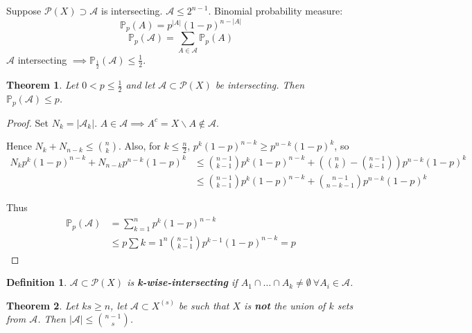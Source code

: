 \documentclass[a4paper]{article}
\newtheorem*{definition}{Definition}
\newtheorem{theorem}{Theorem}
\newcommand*\abs[1]{\left|#1\right|}
\begin{document}
Suppose $\mathcal{P}(X) \supset \mathcal{A}$ is intersecting.
$\mathcal{A} \leq 2^{n-1}$.
Binomial probability measure:
$$\mathbb{P}_p(A) = p^{\abs{A}}(1-p)^{n-\abs{A}}$$
$$\mathbb{P}_p(\mathcal{A}) = \sum_{A \in \mathcal{A}}\mathbb{P}_p(A)$$
$\mathcal{A}$ intersecting $\implies \mathbb{P}_{\frac{1}{2}}(\mathcal{A}) \leq \frac{1}{2}$.

\begin{theorem}
	Let $0<p\leq \frac{1}{2}$ and let $\mathcal{A} \subset \mathcal{P}(X)$ be intersecting.
	Then $\mathbb{P}_p(\mathcal{A}) \leq p$.
\end{theorem}
\begin{proof}
	Set $N_k = \abs{\mathcal{A}_k}$.
	$A \in \mathcal{A} \implies A^c = X\backslash A \not\in \mathcal{A}$.
	
	Hence $N_k + N_{n-k} \leq {n \choose k}$.
	Also, for $k \leq \frac{n}{2}$, $p^k(1-p)^{n-k} \geq p^{n-k}(1-p)^k$, so
	\begin{align*}
		N_kp^k(1-p)^{n-k} + N_{n-k}p^{n-k}(1-p)^k & \leq {n-1 \choose k-1}p^k(1-p)^{n-k} + \left({n \choose k} - {n-1 \choose k-1}\right)p^{n-k}(1-p)^k \\
		& \leq {n-1 \choose k-1}p^k(1-p)^{n-k} + {n-1 \choose n-k-1}p^{n-k}(1-p)^k
	\end{align*}
	
	Thus
	\begin{align*}
		\mathbb{P}_p(\mathcal{A}) &= \sum_{k=1}^n p^k(1-p)^{n-k} \\
		&\leq p \sum{k=1}^n {n-1 \choose k-1}p^{k-1}(1-p)^{n-k} = p
	\end{align*}
\end{proof}

\begin{definition}
	$\mathcal{A} \subset \mathcal{P}(X)$ is \textbf{k-wise-intersecting} if $A_1 \cap \dots \cap A_k \neq \emptyset\ \forall A_i \in \mathcal{A}$.
\end{definition}

\begin{theorem}
	Let $ks \geq n$,
	let $\mathcal{A} \subset X^{(s)}$ be such that $X$ is \textbf{not} the union of $k$ sets from $\mathcal{A}$.
	Then $\abs{\mathcal{A}} \leq {n-1 \choose s}$.
\end{theorem}
\end{document}
